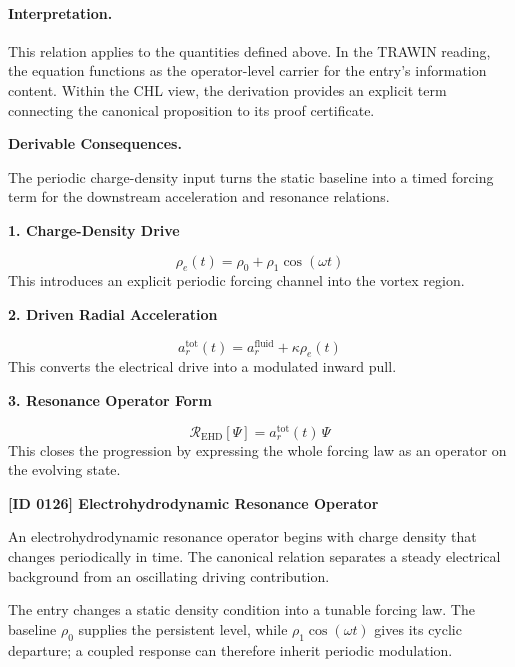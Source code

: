 \paragraph{Interpretation.}
This relation applies to the quantities defined above. In the TRAWIN reading, the equation functions as the operator-level carrier for the entry’s information content. Within the CHL view, the derivation provides an explicit term connecting the canonical proposition to its proof certificate.

\par\vspace{0.35em}
\noindent\textbf{Derivable Consequences.}\quad
\begingroup
\footnotesize
\raggedright
The periodic charge-density input turns the static baseline into a timed forcing term for the downstream acceleration and resonance relations.
\par\endgroup

\noindent\textbf{1. Charge-Density Drive}\par
\[
\rho_e(t) = \rho_0 + \rho_1\cos(\omega t)
\]
\noindent This introduces an explicit periodic forcing channel into the vortex region.\par
\noindent\textbf{2. Driven Radial Acceleration}\par
\[
a_r^{\mathrm{tot}}(t) = a_r^{\mathrm{fluid}} + \kappa\rho_e(t)
\]
\noindent This converts the electrical drive into a modulated inward pull.\par
\noindent\textbf{3. Resonance Operator Form}\par
\[
\mathcal{R}_{\mathrm{EHD}}[\Psi] = a_r^{\mathrm{tot}}(t)\,\Psi
\]
\noindent This closes the progression by expressing the whole forcing law as an operator on the evolving state.\par

\clearpage
\noindent\textbf{[ID 0126] Electrohydrodynamic Resonance Operator}\par
\vspace{0.35em}
\begingroup\small


An electrohydrodynamic resonance operator begins with charge density that changes periodically in time. The canonical relation separates a steady electrical background from an oscillating driving contribution.


The entry changes a static density condition into a tunable forcing law. The baseline \(\rho_0\) supplies the persistent level, while \(\rho_1\cos(\omega t)\) gives its cyclic departure; a coupled response can therefore inherit periodic modulation.

